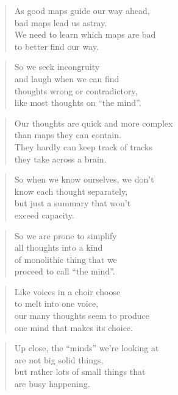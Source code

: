 \documentclass[14pt,a4paper]{article}
\begin{document}
\begin{verse}
As good maps guide our way ahead,\\
bad maps lead us astray.\\
We need to learn which maps are bad\\
to better find our way.
\end{verse}

\begin{verse}
So we seek incongruity\\
and laugh when we can find\\
thoughts wrong or contradictory,\\
like most thoughts on “the mind”.
\end{verse}

\begin{verse}
Our thoughts are quick and more complex\\
than maps they can contain.\\
They hardly can keep track of tracks\\
they take across a brain.
\end{verse}

\begin{verse}
So when we know ourselves, we don’t\\
know each thought separately,\\
but just a summary that won’t\\
exceed capacity.
\end{verse}

\begin{verse}
So we are prone to simplify\\
all thoughts into a kind\\
of monolithic thing that we\\
proceed to call “the mind”.
\end{verse}

\begin{verse}
Like voices in a choir choose\\
to melt into one voice,\\
our many thoughts seem to produce\\
one mind that makes its choice.
\end{verse}

\begin{verse}
Up close, the “minds” we’re looking at\\
are not big solid things,\\
but rather lots of small things that\\
are busy happening.
\end{verse}
\end{document}
